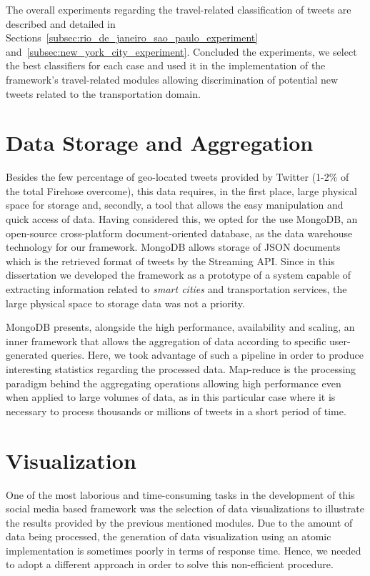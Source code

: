 The overall experiments regarding the travel-related classification of tweets are described and detailed in Sections~\ref{subsec:rio_de_janeiro_sao_paulo_experiment} and~\ref{subsec:new_york_city_experiment}. Concluded the experiments, we select the best classifiers for each case and used it in the implementation of the framework's travel-related modules allowing discrimination of potential new tweets related to the transportation domain.

\section{Data Storage and Aggregation}\label{sec:storage_aggregations}

Besides the few percentage of geo-located tweets provided by Twitter (1-2\% of the total Firehose overcome), this data requires, in the first place, large physical space for storage and, secondly, a tool that allows the easy manipulation and quick access of data. Having considered this, we opted for the use MongoDB, an open-source cross-platform document-oriented database, as the data warehouse technology for our framework. MongoDB allows storage of \gls{JSON} documents which is the retrieved format of tweets by the Streaming \gls{API}. Since in this dissertation we developed the framework as a prototype of a system capable of extracting information related to \textit{smart cities} and transportation services, the large physical space to storage data was not a priority.

MongoDB presents, alongside the high performance, availability and scaling, an inner framework that allows the aggregation of data according to specific user-generated queries. Here, we took advantage of such a pipeline in order to produce interesting statistics regarding the processed data. Map-reduce is the processing paradigm behind the aggregating operations allowing high performance even when applied to large volumes of data, as in this particular case where it is necessary to process thousands or millions of tweets in a short period of time.

\section{Visualization}\label{sec:visualization}

One of the most laborious and time-consuming tasks in the development of this social media based framework was the selection of data visualizations to illustrate the results provided by the previous mentioned modules. Due to the amount of data being processed, the generation of data visualization using an atomic implementation is sometimes poorly in terms of response time. Hence, we needed to adopt a different approach in order to solve this non-efficient procedure.

